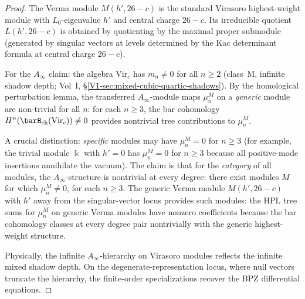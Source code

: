 \begin{proof}
The Verma module $M(h',26-c)$ is the standard Virasoro
highest-weight module with $L_0$-eigenvalue $h'$ and
central charge $26-c$. Its irreducible quotient
$L(h',26-c)$ is obtained by quotienting by the maximal
proper submodule (generated by singular vectors at
levels determined by the Kac determinant formula at
central charge $26-c$).

For the $A_\infty$ claim: the algebra $\mathrm{Vir}_c$ has
$m_n\ne 0$ for all $n\ge 2$ (class~M, infinite shadow
depth; Vol~I, \S\ref*{V1-sec:mixed-cubic-quartic-shadows}).
By the homological perturbation lemma, the transferred
$A_\infty$-module maps $\mu_n^M$ on a \emph{generic}
module are non-trivial for all $n$: for each $n\ge 3$,
the bar cohomology $H^n(\barB_{\mathrm{ch}}(\mathrm{Vir}_c))
\ne 0$ provides nontrivial tree contributions to $\mu_n^M$.

A crucial distinction: \emph{specific} modules may have
$\mu_n^M = 0$ for $n\ge 3$ (for example, the trivial module
$\Bbbk$ with $h'=0$ has $\mu_n^M = 0$ for $n\ge 3$ because
all positive-mode insertions annihilate the vacuum). The
claim is that for the \emph{category} of all modules, the
$A_\infty$-structure is nontrivial at every degree: there exist
modules $M$ for which $\mu_n^M\ne 0$, for each $n\ge 3$. The
generic Verma module $M(h',26-c)$ with $h'$ away from the
singular-vector locus provides such modules: the HPL tree
sums for $\mu_n^M$ on generic Verma modules have nonzero
coefficients because the bar cohomology classes at every
degree pair nontrivially with the generic highest-weight
structure.

Physically, the infinite
$A_\infty$-hierarchy on Virasoro modules reflects the
infinite mixed shadow depth. On the
degenerate-representation locus, where null
vectors truncate the hierarchy, the finite-order
specializations recover the BPZ
differential equations.
\end{proof}


